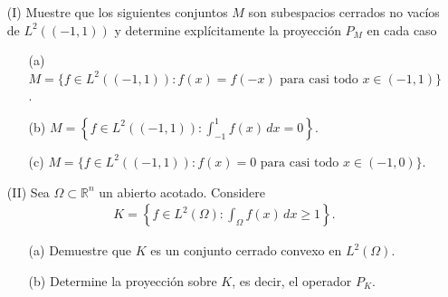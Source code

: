 \begin{enumerate}
    \item[(I)] Muestre que los siguientes conjuntos $M$ son subespacios cerrados no vacíos de $L^2((-1,1))$ y determine explícitamente la proyección $P_M$ en cada caso
    \begin{enumerate}
        \item[(a)] $M=\{f \in L^2((-1,1)):f(x)=f(-x) \text{ para casi todo } x \in (-1,1)\}$.
        \item[(b)] $\displaystyle M=\left\{f \in L^2((-1,1)):\int_{-1}^1f(x)\, dx=0\right\}$.
        \item[(c)] $M=\{f \in L^2((-1,1)):f(x)=0 \text{ para casi todo } x\in (-1,0)\}$.
    \end{enumerate}
    \item[(II)] Sea $\Omega\subset \mathbb{R}^n$ un abierto acotado. Considere
    \begin{align*}
        K=\left\{f\in L^2(\Omega):\int_{\Omega}f(x)\, dx\geq 1\right\}.
    \end{align*}
    \begin{enumerate}
        \item[(a)] Demuestre que $K$ es un conjunto cerrado convexo en $L^2(\Omega)$.
        \item[(b)] Determine la proyección sobre $K$, es decir, el operador $P_K$.
    \end{enumerate}
    \end{enumerate}

